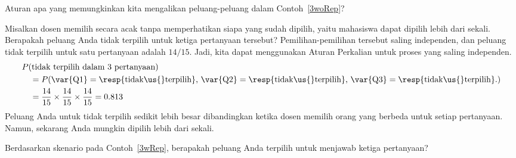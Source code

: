 \begin{exercisewrap}
\begin{nexercise}
Aturan apa yang memungkinkan kita mengalikan peluang-peluang dalam Contoh~\ref{3woRep}?\footnotemark
\end{nexercise}
\end{exercisewrap}

\D{\newpage}

\begin{examplewrap}
\begin{nexample}{Misalkan dosen memilih secara acak tanpa memperhatikan siapa yang sudah dipilih, yaitu mahasiswa dapat dipilih lebih dari sekali. Berapakah peluang Anda tidak terpilih untuk ketiga pertanyaan tersebut?}\label{3wRep}
Pemilihan-pemilihan tersebut saling independen, dan peluang tidak terpilih untuk satu pertanyaan adalah $14/15$. Jadi, kita dapat menggunakan Aturan Perkalian untuk proses yang saling independen.
\begin{align*}
&P(\text{tidak terpilih dalam 3 pertanyaan}) \\
&\quad = P(\text{\var{Q1}} = \text{\resp{tidak\us{}terpilih}, }\text{\var{Q2}} = \text{\resp{tidak\us{}terpilih}, }\text{\var{Q3}} = \text{\resp{tidak\us{}terpilih}.}) \\
&\quad = \frac{14}{15}\times\frac{14}{15}\times\frac{14}{15} = 0.813
\end{align*}
Peluang Anda untuk tidak terpilih sedikit lebih besar dibandingkan ketika dosen memilih orang yang berbeda untuk setiap pertanyaan. Namun, sekarang Anda mungkin dipilih lebih dari sekali.
\end{nexample}
\end{examplewrap}

\begin{exercisewrap}
\begin{nexercise}
Berdasarkan skenario pada Contoh~\ref{3wRep}, berapakah peluang Anda terpilih untuk menjawab ketiga pertanyaan?\footnotemark
\end{nexercise}
\end{exercisewrap}

